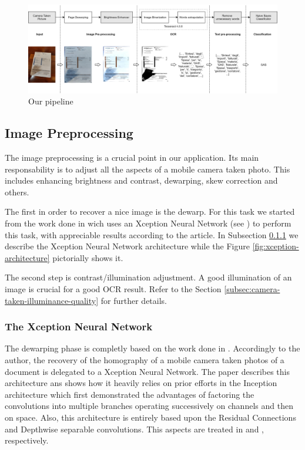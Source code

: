 \documentclass[10pt,twocolumn,letterpaper]{article}
\begin{document}
\begin{figure}[!ht]
  \centering
  \includegraphics[width=1.0\textwidth]{images/pipeline.png}
  \caption{Our pipeline}
  \label{fig:pipeline}
\end{figure}

\subsection{Image Preprocessing}

The image preprocessing is a crucial point in our application. Its
main responsability is to adjust all the aspects of a mobile camera
taken photo. This includes enhancing brightness and contrast,
dewarping, skew correction and others.

The first in order to recover a nice image is the dewarp. For this
task we started from the work done in \cite{Korber18} wich uses an
Xception Neural Network (see \cite{Xception}) to perform this task,
with appreciable results according to the article. In Subsection
\ref{subsec:xception-nn-architecture} we describe the Xception Neural
Network architecture while the Figure \ref{fig:xception-architecture}
pictorially shows it.

The second step is contrast/illumination adjustment. A good
illumination of an image is crucial for a good OCR result. Refer to
the Section \ref{subsec:camera-taken-illuminance-quality} for further
details.

\subsubsection{The Xception Neural Network}
\label{subsec:xception-nn-architecture}

The dewarping phase is completly based on the work done in
\cite{Korber18}. Accordingly to the author, the recovery of the
homography of a mobile camera taken photos of a document is delegated
to a Xception Neural Network. The paper \cite{Xception} describes this
architecture ans shows how it heavily relies on prior efforts in the
Inception architecture which first demonstrated the advantages of
factoring the convolutions into multiple branches operating
successively on channels and then on space. Also, this architecture is
entirely based upon the Residual Connections and Depthwise separable
convolutions. This aspects are treated in \cite{Sahoo17} and
\cite{Wang18}, respectively.
\end{document}
